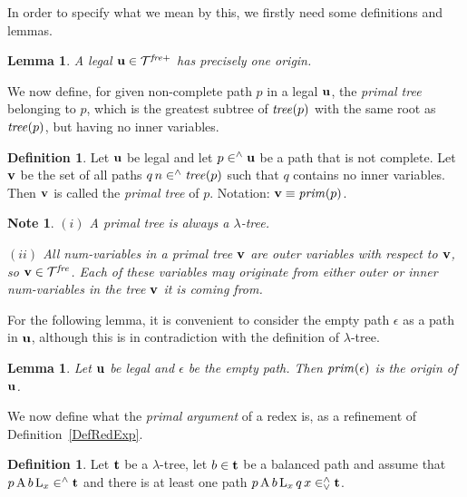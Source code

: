 \documentclass{article}
\theoremstyle{plain}
\newtheorem{Lem}[The]{Lemma}
\newtheorem{Note}[The]{Note}
\theoremstyle{definition}
\newtheorem{Def}[The]{Definition}
\begin{document}
{In order to specify what we mean by this, we firstly need some definitions and lemmas.

\begin{Lem} A legal ${\bf u} \in {\cal T}^{\it fre+}$ has precisely one origin.


\end{Lem}

We now define, for given non-complete path $p$ in a legal ${\bf u}$, the {\em primal tree\/} belonging to $p$, which is the greatest subtree of ${\it tree}(p)$ with the same root as ${\it tree}(p)$, but having no inner variables.

\begin{Def}
Let ${\bf u}$ be legal and let $p \in^\wedge {\bf u}$ be a path that is not complete.  Let ${\bf v}$ be the set of all paths $q \, n \in^\wedge {\it tree}(p)$ such that $q$ contains no inner variables. Then ${\bf v}$ is called the {\em primal tree\/} of $p$. Notation: ${\bf v} \equiv {\it prim}(p)$.
\end{Def}

\begin{Note} $(i)$ A primal tree is always a $\lambda$-tree.

$(ii)$ All num-variables in a primal tree ${\bf v}$ are {\it outer\/} variables with respect to ${\bf v}$, so ${\bf v} \in {\cal T}^{\it fre}$. Each of these variables may originate from {\em either outer or inner\/} num-variables in the tree ${\bf v}$ it is coming from.
\end{Note}

For the following  lemma, it is convenient to consider the empty path $\epsilon$ as a path in ${\bf u}$, although this is in contradiction with the definition of $\lambda$-tree.

\begin{Lem}
Let ${\bf u}$ be legal and $\epsilon$ be the empty path. Then ${\it prim}(\epsilon)$ is the origin of ${{\bf u}}$.
\end{Lem}

\medskip

We now define what the {\it primal argument\/} of a redex is, as a refinement of Definition~\ref{DefRedExp}.

\begin{Def}\label{DefPriArg}
Let ${\bf t}$ be a $\lambda$-tree, let $b \in {\bf t}$ be a balanced path and assume that $p \, {\rm A} \, b \, {\rm L}_x \in^\wedge {\bf t}$ and there is at least one path $p \, {\rm A} \, b \, {\rm L}_x \, q \, x \in^\wedge_\vee {\bf t}$.


\end{Def}}
\end{document}
